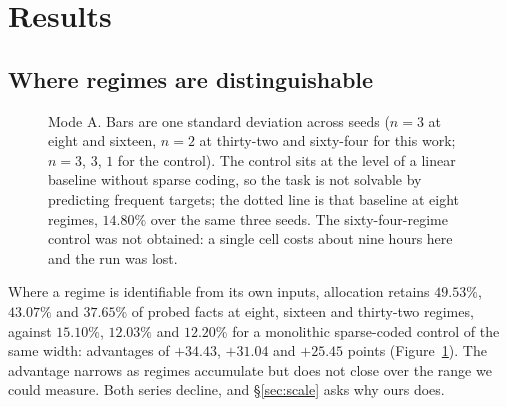 \documentclass[11pt,a4paper]{article}
\begin{document}
\section{Results}

\subsection{Where regimes are distinguishable}
\label{sec:modea}

\begin{figure}[h]
\centering
{}
\caption{Mode A. Bars are one standard deviation across seeds ($n=3$ at eight
and sixteen, $n=2$ at thirty-two and sixty-four for this work; $n=3$, $3$, $1$
for the control). The control sits at the level of a linear baseline without
sparse coding, so the task is not solvable by predicting frequent targets; the
dotted line is that baseline at eight regimes, $14.80\%$ over the same three
seeds. The sixty-four-regime control was not obtained: a single cell costs about nine
hours here and the run was lost.}
\label{fig:scale}
\end{figure}

Where a regime is identifiable from its own inputs, allocation retains
$49.53\%$, $43.07\%$ and $37.65\%$ of probed facts at eight, sixteen and
thirty-two regimes, against $15.10\%$, $12.03\%$ and $12.20\%$ for a monolithic
sparse-coded control of the same width: advantages of $+34.43$, $+31.04$ and
$+25.45$ points (Figure~\ref{fig:scale}). The advantage narrows as regimes
accumulate but does not close over the range we could measure. Both series
decline, and \S\ref{sec:scale} asks why ours does.
\end{document}
